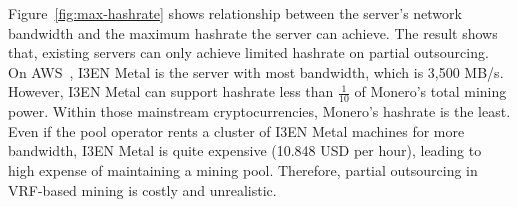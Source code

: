 Figure~\ref{fig:max-hashrate} shows relationship between the server's network bandwidth and the maximum hashrate the server can achieve.
The result shows that, existing servers can only achieve limited hashrate on partial outsourcing.
On AWS~\cite{aws}, I3EN Metal is the server with most bandwidth, which is 3,500 MB/s.
However, I3EN Metal can support hashrate less than $\frac{1}{10}$ of Monero's total mining power.
Within those mainstream cryptocurrencies, Monero's hashrate is the least.
Even if the pool operator rents a cluster of I3EN Metal machines for more bandwidth, I3EN Metal is quite expensive (10.848 USD per hour), leading to high expense of maintaining a mining pool.
Therefore, partial outsourcing in VRF-based mining is costly and unrealistic.









        







